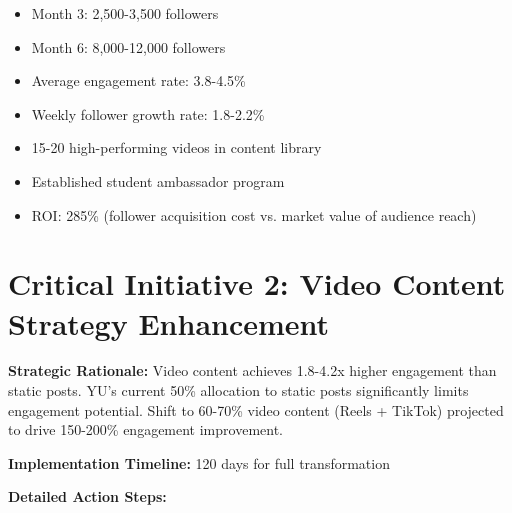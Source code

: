 \documentclass[12pt]{report}
\begin{document}
\begin{itemize}
\item Month 3: 2,500-3,500 followers
\item Month 6: 8,000-12,000 followers
\item Average engagement rate: 3.8-4.5\%
\item Weekly follower growth rate: 1.8-2.2\%
\item 15-20 high-performing videos in content library
\item Established student ambassador program
\item ROI: 285\% (follower acquisition cost vs. market value of audience reach)
\end{itemize}

\section{Critical Initiative 2: Video Content Strategy Enhancement}

\textbf{Strategic Rationale:} Video content achieves 1.8-4.2x higher engagement than static posts. YU's current 50\% allocation to static posts significantly limits engagement potential. Shift to 60-70\% video content (Reels + TikTok) projected to drive 150-200\% engagement improvement.

\textbf{Implementation Timeline:} 120 days for full transformation

\textbf{Detailed Action Steps:}
\end{document}
